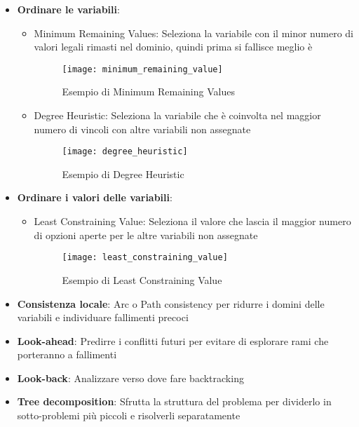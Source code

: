 \documentclass[a4paper]{article}
\begin{document}
\begin{itemize}
  \item \textbf{Ordinare le variabili}:
    \begin{itemize}
      \item Minimum Remaining Values: Seleziona la variabile con il minor numero di valori
        legali rimasti nel dominio, quindi prima si fallisce meglio è
        \begin{figure}[H]
          \centering
          \texttt{[image: minimum\_remaining\_value]}
          \caption{Esempio di Minimum Remaining Values}
        \end{figure}
      \item Degree Heuristic: Seleziona la variabile che è coinvolta nel maggior numero
        di vincoli con altre variabili non assegnate
        \begin{figure}[H]
          \centering
          \texttt{[image: degree\_heuristic]}
          \caption{Esempio di Degree Heuristic}
        \end{figure}
    \end{itemize}

  \item \textbf{Ordinare i valori delle variabili}:
    \begin{itemize}
      \item Least Constraining Value: Seleziona il valore che lascia il maggior numero
        di opzioni aperte per le altre variabili non assegnate
        \begin{figure}[H]
          \centering
          \texttt{[image: least\_constraining\_value]}
          \caption{Esempio di Least Constraining Value}
        \end{figure}
    \end{itemize}

  \item \textbf{Consistenza locale}: Arc o Path consistency per ridurre i domini delle
    variabili e individuare fallimenti precoci

  \item \textbf{Look-ahead}: Predirre i conflitti futuri per evitare di esplorare
    rami che porteranno a fallimenti

  \item \textbf{Look-back}: Analizzare verso dove fare backtracking

  \item \textbf{Tree decomposition}: Sfrutta la struttura del problema per dividerlo in
    sotto-problemi più piccoli e risolverli separatamente
\end{itemize}
\end{document}
